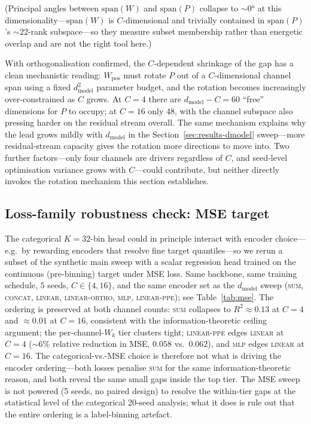 \documentclass[11pt]{article}
\begin{document}
(Principal angles between $\mathrm{span}(W)$ and $\mathrm{span}(P)$
collapse to $\sim$$0°$ at this dimensionality---$\mathrm{span}(W)$
is $C$-dimensional and trivially contained in
$\mathrm{span}(P)$'s $\sim$$22$-rank subspace---so they measure
subset membership rather than energetic overlap and are not the
right tool here.)

With orthogonalisation confirmed, the $C$-dependent shrinkage of
the gap has a clean mechanistic reading: $W_{\text{pos}}$ must
rotate $P$ out of a $C$-dimensional channel span using a fixed
$d_{\text{model}}^2$ parameter budget, and the rotation becomes
increasingly over-constrained as $C$ grows. At $C{=}4$ there are
$d_{\text{model}} - C = 60$ ``free'' dimensions for $P$ to occupy;
at $C{=}16$ only $48$, with the channel subspace also pressing
harder on the residual stream overall. The same mechanism explains
why the lead grows mildly with $d_{\text{model}}$ in the
Section~\ref{sec:results-dmodel} sweep---more residual-stream
capacity gives the rotation more directions to move into. Two
further factors---only four channels are drivers regardless of
$C$, and seed-level optimisation variance grows with $C$---could
contribute, but neither directly invokes the rotation mechanism
this section establishes.

\subsection{Loss-family robustness check: MSE target}
\label{sec:results-mse}



The categorical $K{=}32$-bin head could in principle interact with
encoder choice---e.g.\ by rewarding encoders that resolve fine
target quantiles---so we rerun a subset of the synthetic main sweep
with a scalar regression head trained on the continuous
(pre-binning) target under MSE loss. Same backbone, same training
schedule, $5$ seeds, $C \in \{4, 16\}$, and the same encoder set
as the $d_{\text{model}}$ sweep (\textsc{sum}, \textsc{concat},
\textsc{linear}, \textsc{linear-ortho}, \textsc{mlp},
\textsc{linear-ppe}); see Table~\ref{tab:mse}. The ordering is
preserved at both channel counts: \textsc{sum} collapses to $R^2
\approx 0.13$ at $C{=}4$ and $\approx 0.01$ at $C{=}16$, consistent
with the information-theoretic ceiling argument; the
per-channel-$W_k$ tier clusters tight; \textsc{linear-ppe} edges
\textsc{linear} at $C{=}4$ ($\sim$$6\%$ relative reduction in MSE,
$0.058$ vs.\ $0.062$), and \textsc{mlp} edges \textsc{linear} at
$C{=}16$. The
categorical-vs.-MSE choice is therefore not what is driving the
encoder ordering---both losses penalise \textsc{sum} for the same
information-theoretic reason, and both reveal the same small gaps
inside the top tier. The MSE sweep is not powered (5 seeds, no
paired design) to resolve the within-tier gaps at the statistical
level of the categorical 20-seed analysis; what it does is rule out
that the entire ordering is a label-binning artefact.
\end{document}
